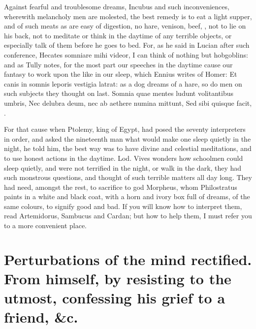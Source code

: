 {Against fearful and troublesome dreams, Incubus and such
inconveniences, wherewith melancholy men are molested, the best remedy
is to eat a light supper, and of such meats as are easy of digestion,
no hare, venison, beef, \etc{}, not to lie on his back, not to meditate or
think in the daytime of any terrible objects, or especially talk of
them before he goes to bed. For, as he said in Lucian after such
conference, Hecates somniare mihi videor, I can think of nothing but
hobgoblins: and as Tully notes,  for the most part our speeches
in the daytime cause our fantasy to work upon the like in our sleep,
which Ennius writes of Homer: Et canis in somnis leporis vestigia
latrat: as a dog dreams of a hare, so do men on such subjects they
thought on last.
Somnia quae mentes ludunt volitantibus umbris,
Nec delubra deum, nec ab aethere numina mittunt,
Sed sibi quisque facit, \etc{}.

For that cause when Ptolemy, king of Egypt, had posed the seventy
interpreters in order, and asked the nineteenth man what would make one
sleep quietly in the night, he told him, the best way was to have
divine and celestial meditations, and to use honest actions in the
daytime. Lod. Vives wonders how schoolmen could sleep quietly,
and were not terrified in the night, or walk in the dark, they had such
monstrous questions, and thought of such terrible matters all day long.
They had need, amongst the rest, to sacrifice to god Morpheus, whom
 Philostratus paints in a white and black coat, with a horn and
ivory box full of dreams, of the same colours, to signify good and bad.
If you will know how to interpret them, read Artemidorus, Sambucus and
Cardan; but how to help them, I must refer you to a more
convenient place.


\section[Perturbations of the mind]{Perturbations of the mind rectified. From himself, by resisting to the utmost, confessing his grief to a friend, \&c.}

}
